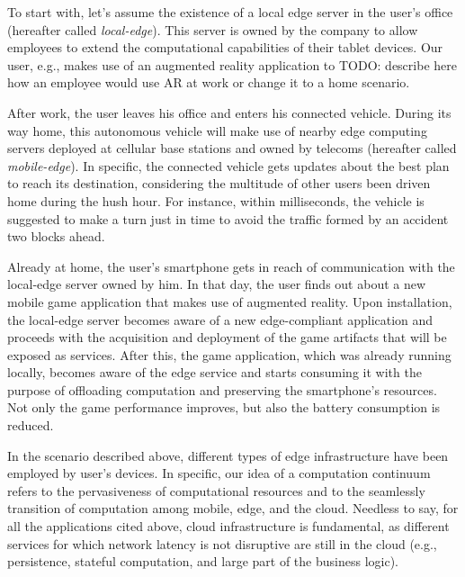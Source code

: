 To start with, let's assume the existence of a local edge server in the user's office (hereafter called \textit{local-edge}). This server is owned by the company to allow employees to extend the computational capabilities of their tablet devices. Our user, e.g., makes use of an augmented reality application to TODO: describe here how an employee would use AR at work or change it to a home scenario.

After work, the user leaves his office and enters his connected vehicle. During its way home, this autonomous vehicle will make use of nearby edge computing servers deployed at cellular base stations and owned by telecoms (hereafter called \textit{mobile-edge}). In specific, the connected vehicle gets updates about the best plan to reach its destination, considering the multitude of other users been driven home during the hush hour. For instance, within milliseconds, the vehicle is suggested to make a turn just in time to avoid the traffic formed by an accident two blocks ahead. 

Already at home, the user's smartphone gets in reach of communication with the local-edge server owned by him. In that day, the user finds out about a new mobile game application that makes use of augmented reality. Upon installation, the local-edge server becomes aware of a new edge-compliant application and proceeds with the acquisition and deployment of the game artifacts that will be exposed as services. After this, the game application, which was already running locally, becomes aware of the edge service and starts consuming it with the purpose of offloading computation and preserving the smartphone's resources. Not only the game performance improves, but also the battery consumption is reduced.  

In the scenario described above, different types of edge infrastructure have been employed by user's devices. In specific, our idea of a computation continuum refers to the pervasiveness of computational resources and to the seamlessly transition of computation among mobile, edge, and the cloud. Needless to say, for all the applications cited above, cloud infrastructure is  fundamental, as different services for which network latency is not disruptive are still in the cloud (e.g., persistence, stateful computation, and large part of the business logic).